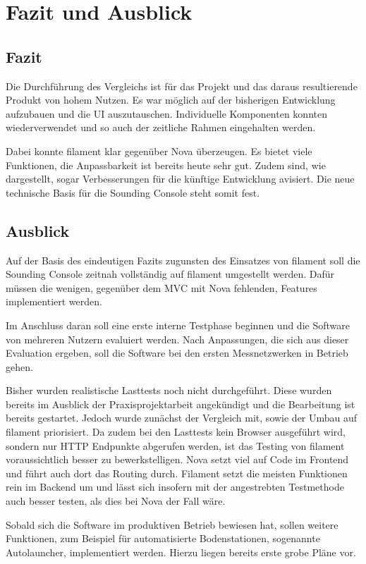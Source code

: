 \newpage


\section{Fazit und Ausblick}

\subsection{Fazit}
Die Durchführung des Vergleichs ist für das Projekt und das daraus resultierende Produkt von hohem Nutzen.
Es war möglich auf der bisherigen Entwicklung aufzubauen und die UI auszutauschen.
Individuelle Komponenten konnten wiederverwendet und so auch der zeitliche Rahmen eingehalten werden.

Dabei konnte filament klar gegenüber Nova überzeugen.
Es bietet viele Funktionen, die Anpassbarkeit ist bereits heute sehr gut.
Zudem sind, wie dargestellt, sogar Verbesserungen für die künftige Entwicklung avisiert.
Die neue technische Basis für die Sounding Console steht somit fest.

\subsection{Ausblick}
Auf der Basis des eindeutigen Fazits zugunsten des Einsatzes von filament soll die Sounding Console zeitnah vollständig auf filament umgestellt werden.
Dafür müssen die wenigen, gegenüber dem MVC mit Nova fehlenden, Features implementiert werden.

Im Anschluss daran soll eine erste interne Testphase beginnen und die Software von mehreren Nutzern evaluiert werden.
Nach Anpassungen, die sich aus dieser Evaluation ergeben, soll die Software bei den ersten Messnetzwerken in Betrieb gehen.

Bisher wurden realistische Lasttests noch nicht durchgeführt.
Diese wurden bereits im Ausblick der Praxisprojektarbeit angekündigt und die Bearbeitung ist bereits gestartet.
Jedoch wurde zunächst der Vergleich mit, sowie der Umbau auf filament priorisiert.
Da zudem bei den Lasttests kein Browser ausgeführt wird, sondern nur HTTP Endpunkte abgerufen werden, ist das Testing von filament voraussichtlich besser zu bewerkstelligen.
Nova setzt viel auf Code im Frontend und führt auch dort das Routing durch.
Filament setzt die meisten Funktionen rein im Backend um und lässt sich insofern mit der angestrebten Testmethode auch besser testen, als dies bei Nova der Fall wäre.

Sobald sich die Software im produktiven Betrieb bewiesen hat, sollen weitere Funktionen, zum Beispiel für automatisierte Bodenstationen, sogenannte Autolauncher, implementiert werden.
Hierzu liegen bereits erste grobe Pläne vor.
